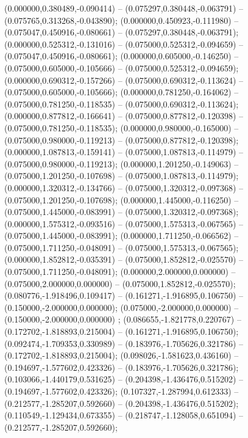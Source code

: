  (0.000000,0.380489,-0.090414) -- (0.075297,0.380448,-0.063791) -- (0.075765,0.313268,-0.043890);
 (0.000000,0.450923,-0.111980) -- (0.075047,0.450916,-0.080661) -- (0.075297,0.380448,-0.063791);
 (0.000000,0.525312,-0.131016) -- (0.075000,0.525312,-0.094659) -- (0.075047,0.450916,-0.080661);
 (0.000000,0.605000,-0.146250) -- (0.075000,0.605000,-0.105666) -- (0.075000,0.525312,-0.094659);
 (0.000000,0.690312,-0.157266) -- (0.075000,0.690312,-0.113624) -- (0.075000,0.605000,-0.105666);
 (0.000000,0.781250,-0.164062) -- (0.075000,0.781250,-0.118535) -- (0.075000,0.690312,-0.113624);
 (0.000000,0.877812,-0.166641) -- (0.075000,0.877812,-0.120398) -- (0.075000,0.781250,-0.118535);
 (0.000000,0.980000,-0.165000) -- (0.075000,0.980000,-0.119213) -- (0.075000,0.877812,-0.120398);
 (0.000000,1.087813,-0.159141) -- (0.075000,1.087813,-0.114979) -- (0.075000,0.980000,-0.119213);
 (0.000000,1.201250,-0.149063) -- (0.075000,1.201250,-0.107698) -- (0.075000,1.087813,-0.114979);
 (0.000000,1.320312,-0.134766) -- (0.075000,1.320312,-0.097368) -- (0.075000,1.201250,-0.107698);
 (0.000000,1.445000,-0.116250) -- (0.075000,1.445000,-0.083991) -- (0.075000,1.320312,-0.097368);
 (0.000000,1.575312,-0.093516) -- (0.075000,1.575313,-0.067565) -- (0.075000,1.445000,-0.083991);
 (0.000000,1.711250,-0.066562) -- (0.075000,1.711250,-0.048091) -- (0.075000,1.575313,-0.067565);
 (0.000000,1.852812,-0.035391) -- (0.075000,1.852812,-0.025570) -- (0.075000,1.711250,-0.048091);
 (0.000000,2.000000,0.000000) -- (0.075000,2.000000,0.000000) -- (0.075000,1.852812,-0.025570);
 (0.080776,-1.918496,0.109417) -- (0.161271,-1.916895,0.106750) -- (0.150000,-2.000000,0.000000);
 (0.075000,-2.000000,0.000000) -- (0.150000,-2.000000,0.000000) ;
 (0.086655,-1.821778,0.220767) -- (0.172702,-1.818893,0.215004) -- (0.161271,-1.916895,0.106750);
 (0.092474,-1.709353,0.330989) -- (0.183976,-1.705626,0.321786) -- (0.172702,-1.818893,0.215004);
 (0.098026,-1.581623,0.436160) -- (0.194697,-1.577602,0.423326) -- (0.183976,-1.705626,0.321786);
 (0.103066,-1.440179,0.531625) -- (0.204398,-1.436476,0.515202) -- (0.194697,-1.577602,0.423326);
 (0.107327,-1.287994,0.612333) -- (0.212577,-1.285207,0.592660) -- (0.204398,-1.436476,0.515202);
 (0.110549,-1.129434,0.673355) -- (0.218747,-1.128058,0.651094) -- (0.212577,-1.285207,0.592660);
